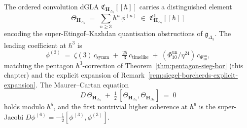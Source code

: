 \begin{theorem}
\label{thm:kcb-universal-MC-element}
The ordered convolution dGLA
$\mathfrak{C}_{\mathbf{H}_{\Delta_5}}[[\hbar]]$ carries a
distinguished element
\[
 \Theta_{\mathbf{H}_{\Delta_5}}
 \;=\; \sum_{n\ge 3}\hbar^n\,\phi^{(n)}
 \;\in\; \mathfrak{C}^1_{\mathbf{H}_{\Delta_5}}[[\hbar]]
\]
encoding the super-Etingof--Kazhdan quantisation obstructions of
$\mathfrak{g}_{\Delta_5}$. The leading coefficient at $\hbar^3$ is
\[
 \phi^{(3)} \;=\; \zeta(3)\,c_{\mathrm{symm}}
 \;+\; \tfrac{25}{3}\,c_{\mathrm{timelike}}
 \;+\; (\Phi_{10}^{\mathrm{un}}/\eta^{24})\, c_{\Phi_{10}^{\mathrm{un}}},
\]
matching the pentagon $\hbar^3$-correction of
Theorem~\ref{thm:pentagon-sieg-bor} (this chapter) and the explicit
expansion of Remark~\ref{rem:siegel-borcherds-explicit-expansion}.
The Maurer--Cartan equation
\[
 D\,\Theta_{\mathbf{H}_{\Delta_5}}
 \;+\; \tfrac{1}{2}\,[\Theta_{\mathbf{H}_{\Delta_5}},
 \Theta_{\mathbf{H}_{\Delta_5}}]
 \;=\; 0
\]
holds modulo $\hbar^5$, and the first nontrivial higher coherence at
$\hbar^6$ is the super-Jacobi
$D\phi^{(6)} = -\tfrac{1}{2}[\phi^{(3)},\phi^{(3)}]$.
\end{theorem}

